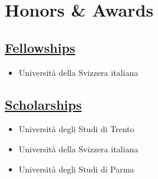 \section{Honors \& Awards}

\subsection{\underline{Fellowships}}

\begin{itemize}
  \item Università della Svizzera italiana
\end{itemize}


\subsection{\underline{Scholarships}}

\begin{itemize}
  \item Università degli Studi di Trento
\end{itemize}


\begin{itemize}
  \item Università della Svizzera italiana
\end{itemize}


\begin{itemize}
  \item Università degli Studi di Parma
\end{itemize}
